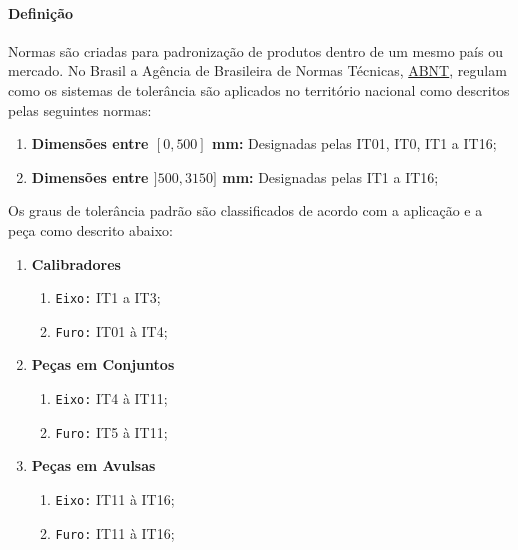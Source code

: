 \documentclass{article}
\begin{document}
            \paragraph{Definição}Normas são criadas para padronização de produtos dentro de um mesmo país ou mercado. No Brasil a Agência de Brasileira de Normas Técnicas, \href{http://www.abnt.org.br/}{ABNT}, regulam como os sistemas de tolerância são aplicados no território nacional como descritos pelas seguintes normas:
                \begin{enumerate}[noitemsep]
                    \item \textbf{Dimensões entre $[0,500]$ mm:} Designadas pelas IT01, IT0, IT1 a IT16;
                    \item \textbf{Dimensões entre $]500,3150]$ mm:} Designadas pelas IT1 a IT16;
                \end{enumerate}
            Os graus de tolerância padrão são classificados de acordo com a aplicação e a peça como descrito abaixo:
                \begin{enumerate}
                    \item \textbf{Calibradores}
                        \begin{enumerate}[noitemsep]
                            \item \texttt{Eixo:} IT1 a IT3;
                            \item \texttt{Furo:} IT01 à IT4;
                        \end{enumerate}
                    \item \textbf{Peças em Conjuntos}
                        \begin{enumerate}[noitemsep]
                            \item \texttt{Eixo:} IT4 à IT11;
                            \item \texttt{Furo:} IT5 à IT11;
                        \end{enumerate}
                    \item \textbf{Peças em Avulsas}
                        \begin{enumerate}[noitemsep]
                            \item \texttt{Eixo:} IT11 à IT16;
                            \item \texttt{Furo:} IT11 à IT16;
                        \end{enumerate}
                \end{enumerate}
\end{document}

